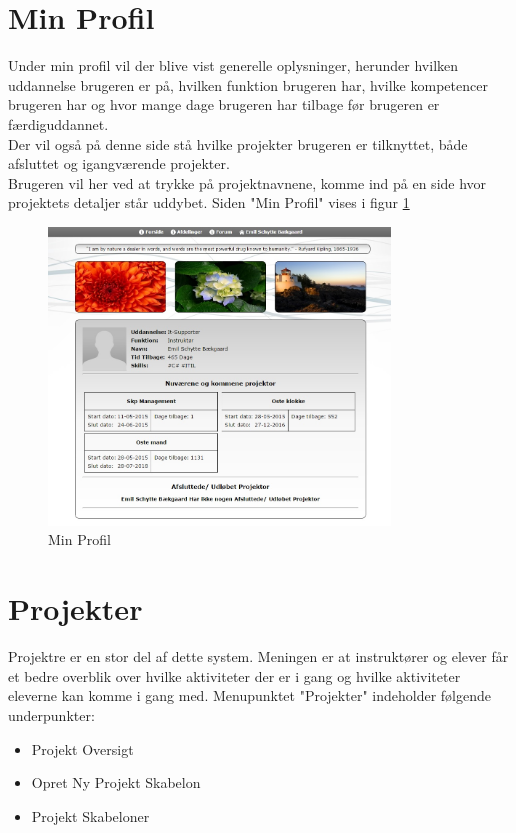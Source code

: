\documentclass{article}
\begin{document}
\newpage
\section{Min Profil}
Under min profil vil der blive vist generelle oplysninger, herunder hvilken uddannelse brugeren er på, hvilken funktion brugeren har, hvilke kompetencer brugeren har og hvor mange dage brugeren har tilbage før brugeren er færdiguddannet. \\
Der vil også på denne side stå hvilke projekter brugeren er tilknyttet, både afsluttet og igangværende projekter.\\
Brugeren vil her ved at trykke på projektnavnene, komme ind på en side hvor projektets detaljer står uddybet. Siden "Min Profil" vises i figur \ref{fig:3}

\begin{figure}[ht]
\includegraphics[width=343px]{minprofil.jpg}
\caption{Min Profil}
\label{fig:3}
\end{figure}
 \newpage
\section{Projekter}
Projektre er en stor del af dette system. Meningen er at instruktører og elever får et bedre overblik over hvilke aktiviteter der er i gang og hvilke aktiviteter eleverne kan komme i gang med. Menupunktet "Projekter" indeholder følgende underpunkter:
\begin{itemize}
\item Projekt Oversigt
\item Opret Ny Projekt Skabelon
\item Projekt Skabeloner
\end{itemize}
\newpage
\end{document}
